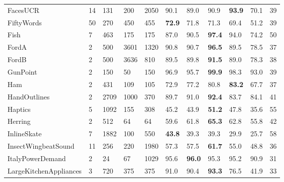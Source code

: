 \documentclass[runningheads]{llncs}
\begin{document}
\begin{table}[t]
\begin{tabular}{>{\tiny}lllll|lllll|l}
		FacesUCR                     & 14        & 131       & 200     & 2050   & 90.1 & 89.0         & 90.9          & \textbf{93.9} & 70.1 & 39          \\
		FiftyWords                   & 50        & 270       & 450     & 455    & \textbf{72.9} & 71.8 & 71.3          & 69.4          & 51.2 & 39          \\
		Fish                         & 7         & 463       & 175     & 175    & 87.0 & 90.5         & \textbf{97.4} & 94.0          & 74.2 & 50          \\
		FordA                        & 2         & 500       & 3601    & 1320   & 90.8 & 90.7         & \textbf{96.5} & 89.5          & 78.5 & 37          \\
		FordB                        & 2         & 500       & 3636    & 810    & 89.5 & 89.8          & \textbf{91.5} & 89.0          & 78.3 & 38          \\
		GunPoint                     & 2         & 150       & 50      & 150    & 96.9 & 95.7         & \textbf{99.9} & 98.3          & 93.0 & 39          \\
		Ham                          & 2         & 431       & 109     & 105    & 72.9 & 77.2          & 80.8          & \textbf{83.2} & 67.7 & 37          \\
		HandOutlines                 & 2         & 2709      & 1000    & 370    & 89.7 & 91.0         & \textbf{92.4} & 83.7          & 84.1 & 41          \\
		Haptics                      & 5         & 1092      & 155     & 308    & 45.2 & 43.9         & \textbf{51.2} & 47.8          & 35.6 & 55          \\
		Herring                      & 2         & 512       & 64      & 64     & 59.6 & 61.8         & \textbf{65.3} & 62.8          & 55.8 & 42          \\
		InlineSkate                  & 7         & 1882      & 100     & 550    & \textbf{43.8} & 39.3 & 39.3          & 29.9          & 25.7 & 58          \\
		InsectWingbeatSound          & 11        & 256       & 220     & 1980   & 57.3 & 57.5         & \textbf{61.7} & 55.0          & 48.8 & 36          \\
		ItalyPowerDemand             & 2         & 24        & 67      & 1029   & 95.6 & \textbf{96.0}         & 95.3          & 95.2          & 90.9 & 31          \\
		LargeKitchenAppliances       & 3         & 720       & 375     & 375    & 91.0 & 90.4          & \textbf{93.3} & 76.5          & 41.9 & 33          \\

\end{tabular}
\end{table}
\end{document}
